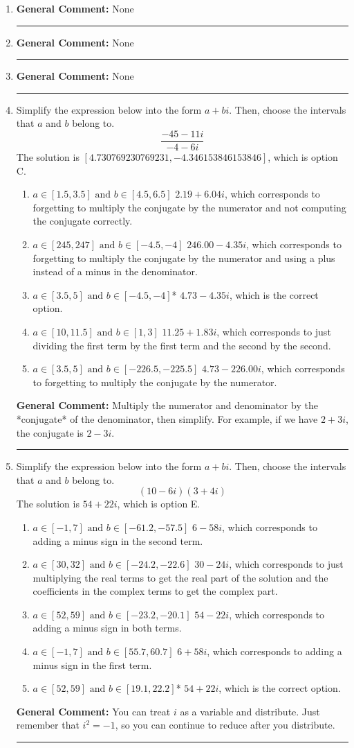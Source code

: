 \documentclass{extbook}[14pt]
\newcommand{\litem}[1]{\item#1\hspace*{-1cm}\rule{\textwidth}{0.4pt}}
\begin{document}
\begin{enumerate}\litem{



\textbf{General Comment:} None
}
\litem{



\textbf{General Comment:} None
}
\litem{



\textbf{General Comment:} None
}
\litem{
Simplify the expression below into the form $a+bi$. Then, choose the intervals that $a$ and $b$ belong to.
\[ \frac{-45 - 11 i}{-4 - 6 i} \]
The solution is \( [4.730769230769231, -4.346153846153846] \), which is option C.\begin{enumerate}[label=\Alph*.]
\item \( a \in [1.5, 3.5] \text{ and } b \in [4.5, 6.5] \) $2.19  + 6.04 i$, which corresponds to forgetting to multiply the conjugate by the numerator and not computing the conjugate correctly.
\item \( a \in [245, 247] \text{ and } b \in [-4.5, -4] \) $246.00  - 4.35 i$, which corresponds to forgetting to multiply the conjugate by the numerator and using a plus instead of a minus in the denominator.
\item \( a \in [3.5, 5] \text{ and } b \in [-4.5, -4] \)* $4.73  - 4.35 i$, which is the correct option.
\item \( a \in [10, 11.5] \text{ and } b \in [1, 3] \) $11.25  + 1.83 i$, which corresponds to just dividing the first term by the first term and the second by the second.
\item \( a \in [3.5, 5] \text{ and } b \in [-226.5, -225.5] \) $4.73  - 226.00 i$, which corresponds to forgetting to multiply the conjugate by the numerator.
\end{enumerate}

\textbf{General Comment:} Multiply the numerator and denominator by the *conjugate* of the denominator, then simplify. For example, if we have $2+3i$, the conjugate is $2-3i$.
}
\litem{
Simplify the expression below into the form $a+bi$. Then, choose the intervals that $a$ and $b$ belong to.
\[ (10 - 6 i)(3 + 4 i) \]
The solution is \( 54 + 22 i \), which is option E.\begin{enumerate}[label=\Alph*.]
\item \( a \in [-1, 7] \text{ and } b \in [-61.2, -57.5] \) $6 - 58 i$, which corresponds to adding a minus sign in the second term.
\item \( a \in [30, 32] \text{ and } b \in [-24.2, -22.6] \) $30 - 24 i$, which corresponds to just multiplying the real terms to get the real part of the solution and the coefficients in the complex terms to get the complex part.
\item \( a \in [52, 59] \text{ and } b \in [-23.2, -20.1] \) $54 - 22 i$, which corresponds to adding a minus sign in both terms.
\item \( a \in [-1, 7] \text{ and } b \in [55.7, 60.7] \) $6 + 58 i$, which corresponds to adding a minus sign in the first term.
\item \( a \in [52, 59] \text{ and } b \in [19.1, 22.2] \)* $54 + 22 i$, which is the correct option.
\end{enumerate}

\textbf{General Comment:} You can treat $i$ as a variable and distribute. Just remember that $i^2=-1$, so you can continue to reduce after you distribute.
}
\end{enumerate}
\end{document}
